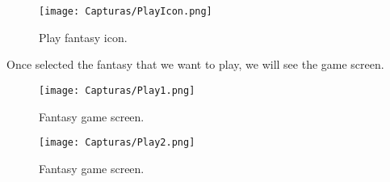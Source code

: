 \documentclass{book}
\begin{document}
\begin{figure}[h]
	\centering
	\texttt{[image: Capturas/PlayIcon.png]}
	\caption{Play fantasy icon.}
	\label{Play fantasy icon}
\end{figure}

\newpage
Once selected the fantasy that we want to play, we will see the game screen.

\begin{figure}[h]
	\centering
	\texttt{[image: Capturas/Play1.png]}
	\caption{Fantasy game screen.}
	\label{Fantasy game screen1}
\end{figure}

\begin{figure}[h]
	\centering
	\texttt{[image: Capturas/Play2.png]}
	\caption{Fantasy game screen.}
	\label{Fantasy game screen2}
\end{figure}
	
\end{document}
